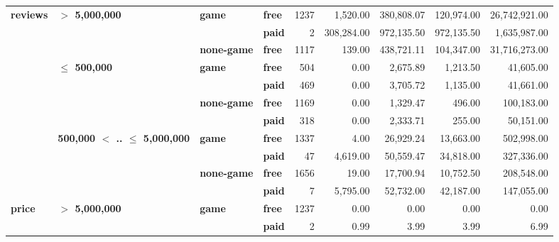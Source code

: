 \begin{tabular}{llll|rrrrr}
\cline{1-9}
\cline{2-9}
\cline{3-9}
\multirow{11}{*}{\textbf{reviews}} & \multirow{3}{*}{\textbf{$>$ 5,000,000}} & \multirow{2}{*}{\textbf{game}} & \textbf{free} &   1237 &   1,520.00 & 380,808.07 & 120,974.00 & 26,742,921.00 \\
      &                                 &           & \textbf{paid} &      2 & 308,284.00 & 972,135.50 & 972,135.50 &  1,635,987.00 \\
\cline{3-9}
      &                                 & \textbf{none-game} & \textbf{free} &   1117 &     139.00 & 438,721.11 & 104,347.00 & 31,716,273.00 \\
\cline{2-9}
      & \multirow{4}{*}{\textbf{$\leq$ 500,000}} & \multirow{2}{*}{\textbf{game}} & \textbf{free} &    504 &       0.00 &   2,675.89 &   1,213.50 &     41,605.00 \\
      &                                 &           & \textbf{paid} &    469 &       0.00 &   3,705.72 &   1,135.00 &     41,661.00 \\
\cline{3-9}
      &                                 & \multirow{2}{*}{\textbf{none-game}} & \textbf{free} &   1169 &       0.00 &   1,329.47 &     496.00 &    100,183.00 \\
      &                                 &           & \textbf{paid} &    318 &       0.00 &   2,333.71 &     255.00 &     50,151.00 \\
\cline{2-9}
\cline{3-9}
      & \multirow{4}{*}{\textbf{500,000 $<$ .. $\leq$ 5,000,000}} & \multirow{2}{*}{\textbf{game}} & \textbf{free} &   1337 &       4.00 &  26,929.24 &  13,663.00 &    502,998.00 \\
      &                                 &           & \textbf{paid} &     47 &   4,619.00 &  50,559.47 &  34,818.00 &    327,336.00 \\
\cline{3-9}
      &                                 & \multirow{2}{*}{\textbf{none-game}} & \textbf{free} &   1656 &      19.00 &  17,700.94 &  10,752.50 &    208,548.00 \\
      &                                 &           & \textbf{paid} &      7 &   5,795.00 &  52,732.00 &  42,187.00 &    147,055.00 \\
\cline{1-9}
\cline{2-9}
\cline{3-9}
\multirow{11}{*}{\textbf{price}} & \multirow{3}{*}{\textbf{$>$ 5,000,000}} & \multirow{2}{*}{\textbf{game}} & \textbf{free} &   1237 &       0.00 &       0.00 &       0.00 &          0.00 \\
      &                                 &           & \textbf{paid} &      2 &       0.99 &       3.99 &       3.99 &          6.99 \\

\end{tabular}
